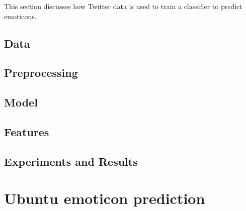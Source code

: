\documentclass{article} %
\begin{document}
\begin{comment}
Approach (roughly 2-3 pages)
• Explain the model; if any important assumptions are made at this stage, explain why they are
reasonable or necessary
• Explain learning / inference algorithms
• Explaining (perhaps briefly) any necessary preprocessing / postprocesing / data acquisition stages
(maybe earlier, depending on the project; may also move to the experimental section)
\end{comment}

This section discusses how Twitter data is used to train a classifier to predict emoticons. 


\subsection{Data}



\subsection{Preprocessing \label{sec:preprocessing}}



\subsection{Model}



\subsection{Features \label{sec:features}}



\subsection{Experiments and Results}



\section{Ubuntu emoticon prediction}

\begin{comment}
Approach (roughly 2-3 pages)
• Explain the model; if any important assumptions are made at this stage, explain why they are
reasonable or necessary
• Explain learning / inference algorithms
• Explaining (perhaps briefly) any necessary preprocessing / postprocesing / data acquisition stages
(maybe earlier, depending on the project; may also move to the experimental section)
\end{comment}
\end{document}
